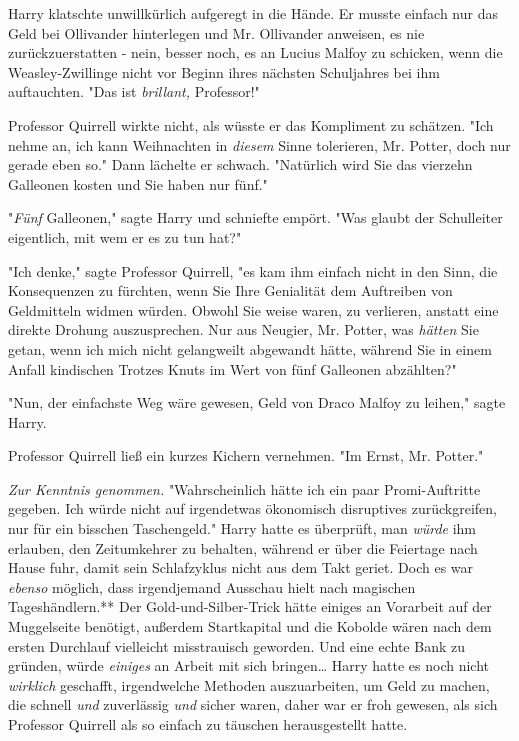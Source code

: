 {Harry klatschte unwillkürlich aufgeregt in die Hände. Er musste einfach nur das Geld bei Ollivander hinterlegen und Mr. Ollivander anweisen, es nie zurückzuerstatten - nein, besser noch, es an Lucius Malfoy zu schicken, wenn die Weasley-Zwillinge nicht vor Beginn ihres nächsten Schuljahres bei ihm auftauchten. "Das ist \emph{brillant,} Professor!"

Professor Quirrell wirkte nicht, als wüsste er das Kompliment zu schätzen. "Ich nehme an, ich kann Weihnachten in \emph{diesem} Sinne tolerieren, Mr. Potter, doch nur gerade eben so." Dann lächelte er schwach. "Natürlich wird Sie das vierzehn Galleonen kosten und Sie haben nur fünf."

"\emph{Fünf} Galleonen," sagte Harry und schniefte empört. "Was glaubt der Schulleiter eigentlich, mit wem er es zu tun hat?"

"Ich denke," sagte Professor Quirrell, "es kam ihm einfach nicht in den Sinn, die Konsequenzen zu fürchten, wenn Sie Ihre Genialität dem Auftreiben von Geldmitteln widmen würden. Obwohl Sie weise waren, zu verlieren, anstatt eine direkte Drohung auszusprechen. Nur aus Neugier, Mr. Potter, was \emph{hätten} Sie getan, wenn ich mich nicht gelangweilt abgewandt hätte, während Sie in einem Anfall kindischen Trotzes Knuts im Wert von fünf Galleonen abzählten?"

"Nun, der einfachste Weg wäre gewesen, Geld von Draco Malfoy zu leihen," sagte Harry.

Professor Quirrell ließ ein kurzes Kichern vernehmen. "Im Ernst, Mr. Potter."

\emph{Zur Kenntnis genommen.} "Wahrscheinlich hätte ich ein paar Promi-Auftritte gegeben. Ich würde nicht auf irgendetwas ökonomisch disruptives zurückgreifen, nur für ein bisschen Taschengeld." Harry hatte es überprüft, man \emph{würde} ihm erlauben, den Zeitumkehrer zu behalten, während er über die Feiertage nach Hause fuhr, damit sein Schlafzyklus nicht aus dem Takt geriet. Doch es war \emph{ebenso} möglich, dass irgendjemand Ausschau hielt nach magischen Tageshändlern.** Der Gold-und-Silber-Trick hätte einiges an Vorarbeit auf der Muggelseite benötigt, außerdem Startkapital und die Kobolde wären nach dem ersten Durchlauf vielleicht misstrauisch geworden. Und eine echte Bank zu gründen, würde \emph{einiges} an Arbeit mit sich bringen… Harry hatte es noch nicht \emph{wirklich} geschafft, irgendwelche Methoden auszuarbeiten, um Geld zu machen, die schnell \emph{und} zuverlässig \emph{und} sicher waren, daher war er froh gewesen, als sich Professor Quirrell als so einfach zu täuschen herausgestellt hatte.

}
